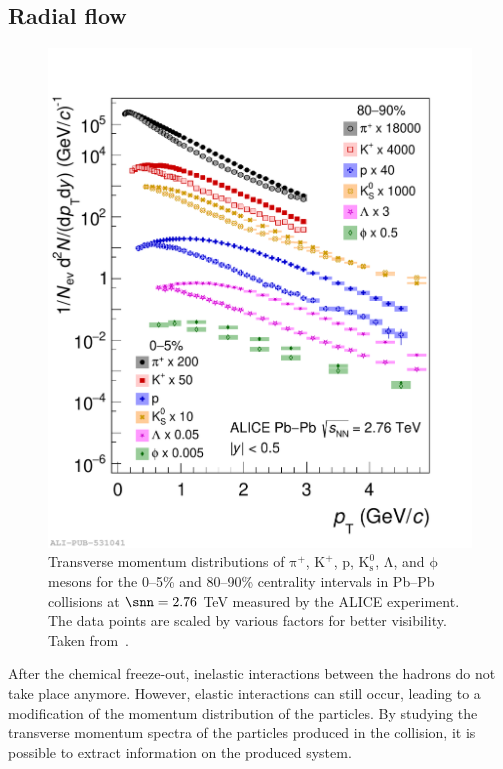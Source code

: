 \subsection{Radial flow}
\begin{figure}[t]
  \centering
  \includegraphics[width=0.7\linewidth]{Figures/Chapter 1/spectra_run1.pdf}
  \caption{Transverse momentum distributions of $\mathrm{\pi^+}$, $\mathrm{K^+}$, p, $\mathrm{K^0_s}$, $\mathrm{\Lambda}$, and $\mathrm{\phi}$ mesons for the 0--5\% and 80--90\% centrality intervals in Pb--Pb collisions at $\snn=2.76$ TeV measured by the ALICE experiment. The data points are scaled by various factors for better visibility. Taken from~\cite{ALICE:2022wpn}.}
  \label{fig:RadialFlow}
\end{figure}
After the chemical freeze-out, inelastic interactions between the hadrons do not take place anymore. However, elastic interactions can still occur, leading to a modification of the momentum distribution of the particles. By studying the transverse momentum spectra of the particles produced in the collision, it is possible to extract information on the produced system.

